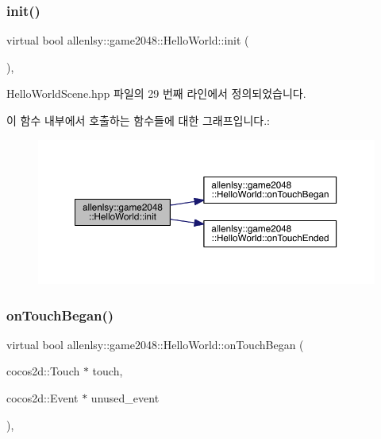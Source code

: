 \subsubsection{\texorpdfstring{init()}{init()}}
{\footnotesize\ttfamily virtual bool allenlsy\+::game2048\+::\+Hello\+World\+::init (\begin{DoxyParamCaption}{ }\end{DoxyParamCaption})\hspace{0.3cm}{\ttfamily [inline]}, {\ttfamily [virtual]}}



Hello\+World\+Scene.\+hpp 파일의 29 번째 라인에서 정의되었습니다.

이 함수 내부에서 호출하는 함수들에 대한 그래프입니다.\+:
\nopagebreak
\begin{figure}[H]
\begin{center}
\leavevmode
\includegraphics[width=350pt]{classallenlsy_1_1game2048_1_1_hello_world_a129b861a8239d9cf2030b1b59e204a46_cgraph}
\end{center}
\end{figure}
\mbox{\label{classallenlsy_1_1game2048_1_1_hello_world_a0cc62fe1173f141d60833be4804f97d9}} 
\subsubsection{\texorpdfstring{on\+Touch\+Began()}{onTouchBegan()}}
{\footnotesize\ttfamily virtual bool allenlsy\+::game2048\+::\+Hello\+World\+::on\+Touch\+Began (\begin{DoxyParamCaption}\item[{cocos2d\+::\+Touch $\ast$}]{touch,  }\item[{cocos2d\+::\+Event $\ast$}]{unused\+\_\+event }\end{DoxyParamCaption})\hspace{0.3cm}{\ttfamily [inline]}, {\ttfamily [virtual]}}



